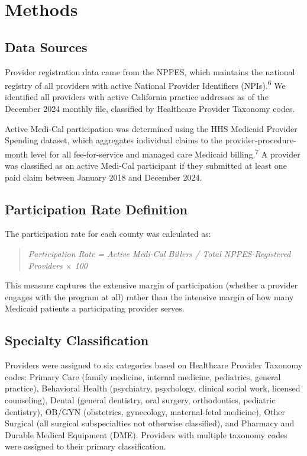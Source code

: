 \documentclass[12pt]{article}
\begin{document}

\section{Methods}

\subsection{Data Sources}

Provider registration data came from the NPPES, which maintains the national registry of all providers with active National Provider Identifiers (NPIs).\textsuperscript{6} We identified all providers with active California practice addresses as of the December 2024 monthly file, classified by Healthcare Provider Taxonomy codes.

Active Medi-Cal participation was determined using the HHS Medicaid Provider Spending dataset, which aggregates individual claims to the provider-procedure-month level for all fee-for-service and managed care Medicaid billing.\textsuperscript{7} A provider was classified as an active Medi-Cal participant if they submitted at least one paid claim between January 2018 and December 2024.

\subsection{Participation Rate Definition}

The participation rate for each county was calculated as:

\begin{quote}
\textit{Participation Rate = Active Medi-Cal Billers / Total NPPES-Registered Providers $\times$ 100}
\end{quote}

This measure captures the extensive margin of participation (whether a provider engages with the program at all) rather than the intensive margin of how many Medicaid patients a participating provider serves.

\subsection{Specialty Classification}

Providers were assigned to six categories based on Healthcare Provider Taxonomy codes: Primary Care (family medicine, internal medicine, pediatrics, general practice), Behavioral Health (psychiatry, psychology, clinical social work, licensed counseling), Dental (general dentistry, oral surgery, orthodontics, pediatric dentistry), OB/GYN (obstetrics, gynecology, maternal-fetal medicine), Other Surgical (all surgical subspecialties not otherwise classified), and Pharmacy and Durable Medical Equipment (DME). Providers with multiple taxonomy codes were assigned to their primary classification.
\end{document}

